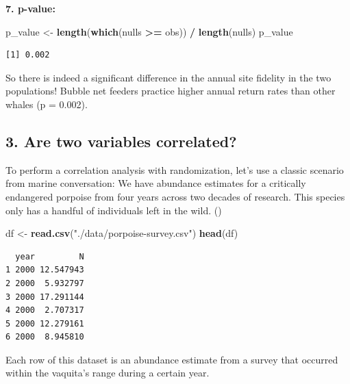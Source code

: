 \documentclass[
]{book}
\newenvironment{Shaded}{\begin{snugshade}}{\end{snugshade}}
\newcommand{\DataTypeTok}[1]{\textcolor[rgb]{0.13,0.29,0.53}{#1}}
\newcommand{\DecValTok}[1]{\textcolor[rgb]{0.00,0.00,0.81}{#1}}
\newcommand{\KeywordTok}[1]{\textcolor[rgb]{0.13,0.29,0.53}{\textbf{#1}}}
\newcommand{\NormalTok}[1]{#1}
\newcommand{\OperatorTok}[1]{\textcolor[rgb]{0.81,0.36,0.00}{\textbf{#1}}}
\newcommand{\StringTok}[1]{\textcolor[rgb]{0.31,0.60,0.02}{#1}}
\begin{document}
\textbf{7. p-value:}

\begin{Shaded}
\begin{Highlighting}[]
\NormalTok{p_value <-}\StringTok{ }\KeywordTok{length}\NormalTok{(}\KeywordTok{which}\NormalTok{(nulls }\OperatorTok{>=}\StringTok{ }\NormalTok{obs)) }\OperatorTok{/}\StringTok{ }\KeywordTok{length}\NormalTok{(nulls)}
\NormalTok{p_value}
\end{Highlighting}
\end{Shaded}

\begin{verbatim}
[1] 0.002
\end{verbatim}

So there is indeed a significant difference in the annual site fidelity in the two populations! Bubble net feeders practice higher annual return rates than other whales (p = 0.002).

\hypertarget{are-two-variables-correlated}{%
\subsection*{3. Are two variables correlated?}\label{are-two-variables-correlated}}

To perform a correlation analysis with randomization, let's use a classic scenario from marine conversation: We have abundance estimates for a critically endangered porpoise from four years across two decades of research. This species only has a handful of individuals left in the wild. ()

\begin{Shaded}
\begin{Highlighting}[]
\NormalTok{df <-}\StringTok{ }\KeywordTok{read.csv}\NormalTok{(}\StringTok{"./data/porpoise-survey.csv"}\NormalTok{)}
\KeywordTok{head}\NormalTok{(df)}
\end{Highlighting}
\end{Shaded}

\begin{verbatim}
  year         N
1 2000 12.547943
2 2000  5.932797
3 2000 17.291144
4 2000  2.707317
5 2000 12.279161
6 2000  8.945810
\end{verbatim}

Each row of this dataset is an abundance estimate from a survey that occurred within the vaquita's range during a certain year.

\begin{Shaded}
\end{Shaded}
\end{document}
